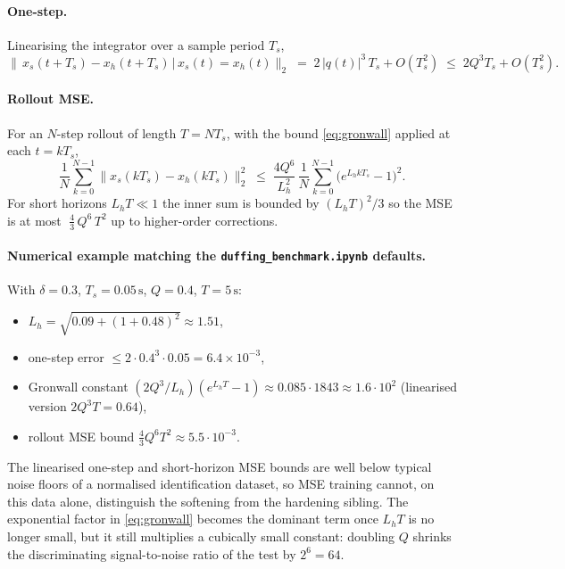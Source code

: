 \documentclass[11pt]{article}
\begin{document}
\paragraph{One-step.}
Linearising the integrator over a sample period \(T_s\),
\begin{equation}
\bigl\|\, x_s(t + T_s) - x_h(t + T_s) \,\bigr|\, x_s(t) = x_h(t) \bigr\|_2
\;=\; 2\, |q(t)|^{3}\, T_s + O(T_s^{2})
\;\le\; 2 Q^{3} T_s + O(T_s^{2}).
\label{eq:one-step}
\end{equation}

\paragraph{Rollout MSE.}
For an \(N\)-step rollout of length \(T = N T_s\), with the bound
\eqref{eq:gronwall} applied at each \(t = k T_s\),
\begin{equation}
\frac{1}{N} \sum_{k=0}^{N-1} \bigl\| x_s(k T_s) - x_h(k T_s) \bigr\|_2^{2}
\;\le\;
\frac{4 Q^{6}}{L_h^{2}}\,
\frac{1}{N} \sum_{k=0}^{N-1}\bigl(e^{L_h k T_s} - 1\bigr)^{2}.
\label{eq:mse-bound}
\end{equation}
For short horizons \(L_h T \ll 1\) the inner sum is bounded by
\((L_h T)^2 / 3\) so the MSE is at most
\(\;\tfrac{4}{3}\, Q^{6}\, T^{2}\) up to higher-order corrections.

\paragraph{Numerical example matching the
\texttt{duffing\_benchmark.ipynb} defaults.}
With \(\delta = 0.3\), \(T_s = 0.05\,\text{s}\), \(Q = 0.4\),
\(T = 5\,\text{s}\):
\begin{itemize}
\item \(L_h = \sqrt{0.09 + (1 + 0.48)^2} \approx 1.51\),
\item one-step error \(\le 2 \cdot 0.4^3 \cdot 0.05 = 6{.}4\times 10^{-3}\),
\item Gronwall constant
      \((2 Q^3 / L_h)(e^{L_h T} - 1) \approx 0.085 \cdot 1843
      \approx 1{.}6 \cdot 10^{2}\)
      (linearised version \(2 Q^3 T = 0.64\)),
\item rollout MSE bound \(\tfrac{4}{3} Q^6 T^2 \approx 5{.}5 \cdot 10^{-3}\).
\end{itemize}
The linearised one-step and short-horizon MSE bounds are well below
typical noise floors of a normalised identification dataset, so MSE
training cannot, on this data alone, distinguish the softening from
the hardening sibling. The exponential factor in \eqref{eq:gronwall}
becomes the dominant term once \(L_h T\) is no longer small, but it
still multiplies a cubically small constant: doubling \(Q\) shrinks
the discriminating signal-to-noise ratio of the test by \(2^{6} = 64\).
\end{document}
